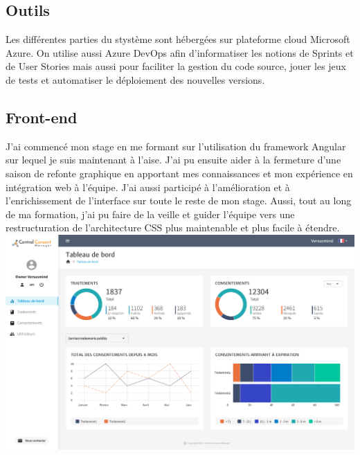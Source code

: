 \documentclass[12pt, a4paper]{report}
\newcommand\tab[1][1cm]{\hspace*{#1}}
\begin{document}
            \subsection{Outils}
                Les différentes parties du stystème sont hébergées sur plateforme cloud Microsoft Azure.\newline
                On utilise aussi Azure DevOps afin d'informatiser les notions de Sprints et de User Stories mais aussi pour faciliter la gestion du code source, jouer les jeux de tests et automatiser le déploiement des nouvelles versions.
            \subsection{Front-end}
                \tab{} J'ai commencé mon stage en me formant sur l'utilisation du framework Angular sur lequel je suis maintenant à l'aise.\newline\newline
                J'ai pu ensuite aider à la fermeture d'une saison de refonte graphique en apportant mes connaissances et mon expérience en intégration web à l'équipe.\newline\newline
                J'ai aussi participé à l'amélioration et à l'enrichissement de l'interface sur toute le reste de mon stage.\newline\newline
                Aussi, tout au long de ma formation, j'ai pu faire de la veille et guider l'équipe vers une restructuration de l'architecture CSS plus maintenable et plus facile à étendre.\newline\newline
                \includegraphics[width=\linewidth]{dashboard.png}
                \newpage
\end{document}
